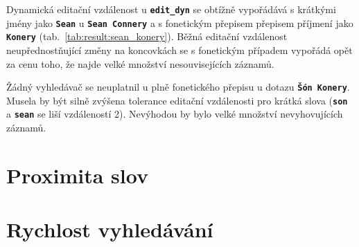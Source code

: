 \documentclass[11pt,letterpaper,oneside,openright]{book}
\newcommand{\bftt}[1]{\texttt{\textbf{#1}}}
\begin{document}
\mbox{}\mbox{}

Dynamická editační vzdálenost u \bftt{edit\_dyn} se obtížně vypořádává s
krátkými jmény jako \bftt{Sean} u \bftt{Sean Connery} a s fonetickým přepisem
přepisem příjmení jako \bftt{Konery} (tab.~\ref{tab:result:sean_konery}). Běžná
editační vzdálenost neupřednostňující změny na koncovkách se s fonetickým
případem vypořádá opět za cenu toho, že najde velké množství nesouvisejících
záznamů.

Žádný vyhledávač se neuplatnil u plně fonetického přepisu u dotazu \bftt{Šón
Konery}. Musela by být silně zvýšena tolerance editační vzdálenosti pro krátká
slova (\bftt{son} a \bftt{sean} se liší vzdáleností 2). Nevýhodou by bylo velké
množství nevyhovujících záznamů.

\section{Proximita slov}


\mbox{}\mbox{}

\mbox{}\mbox{}



\clearpage
\section{Rychlost vyhledávání}

\end{document}
